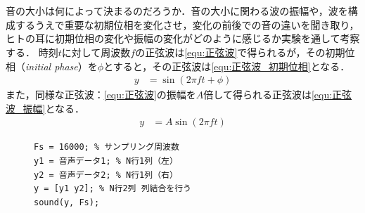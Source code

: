 \section{\kadaiab}\label{sec:\kadaiab}
\purpose
音の大小は何によって決まるのだろうか．音の大小に関わる波の振幅や，波を構成するうえで重要な初期位相を変化させ，変化の前後での音の違いを聞き取り，ヒトの耳に初期位相の変化や振幅の変化がどのように感じるか実験を通して考察する．
\method
時刻\(t\)に対して周波数\(f\)の正弦波は\eqref{equ:正弦波}で得られるが，その初期位相（\textit{initial phase}）を\(\phi\)とすると，その正弦波は\eqref{equ:正弦波_初期位相}となる．
\begin{align}
    y & =\sin(2\pi ft+\phi)\label{equ:正弦波_初期位相}
\end{align}また，同様な正弦波：\eqref{equ:正弦波}の振幅を\(A\)倍して得られる正弦波は\eqref{equ:正弦波_振幅}となる．
\begin{align}
    y & =A\sin(2\pi ft)\label{equ:正弦波_振幅}
\end{align}
\begin{figure}
    \vspace{-.5cm}
    \begin{lstlisting}[caption={左右から別の音を出力},label={src:左右から別の音を出力},numbers={none}]
Fs = 16000; % サンプリング周波数
y1 = 音声データ1; % N行1列（左）
y2 = 音声データ2; % N行1列（右）
y = [y1 y2]; % N行2列 列結合を行う
sound(y, Fs); 
    \end{lstlisting}
\end{figure}
